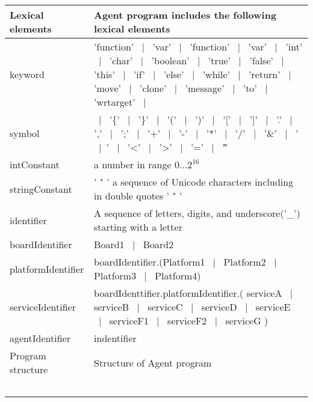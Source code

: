 \documentclass{scrreprt}
\begin{document}
\begin{longtable}{|l|p{5in}|}
\hline
Lexical elements	
&
Agent program includes the following lexical elements
\\
\hline
keyword
&
'function' $~\mid~$ 'var' $~\mid~$ 'function' $~\mid~$ 'var' $~\mid~$ 'int' $~\mid~$ 'char' $~\mid~$ 'boolean' $~\mid~$ 'true' $~\mid~$ 'false' $~\mid~$ 'this' $~\mid~$ 'if' $~\mid~$ 'else' $~\mid~$ 'while' $~\mid~$ 'return' $~\mid~$ 'move' $~\mid~$ 'clone' $~\mid~$  'message' $~\mid~$  'to'  $~\mid~$  'wrtarget'  $~\mid~$
\\
\hline
symbol
&
$~\mid~$  '\{'  $~\mid~$  '\}'  $~\mid~$  '('  $~\mid~$  ')'  $~\mid~$  '['  $~\mid~$  ']'  $~\mid~$  '.'  $~\mid~$  ','  $~\mid~$  ';'  $~\mid~$  '+'  $~\mid~$  '-'  $~\mid~$  '*'  $~\mid~$  '/'  $~\mid~$  '\&'  $~\mid~$  '$~\mid~$'  $~\mid~$  '<'  $~\mid~$  '>'  $~\mid~$  '='  $~\mid~$  '\~ 	'	
\\
\hline
intConstant
&
a number in range $0 \ldots 2^{16}$
\\
\hline
stringConstant
&
' " ' a sequence of Unicode characters including in double quotes ' " '
\\
\hline
identifier
&
A sequence of letters, digits, and underscore('_') starting with a letter
\\
\hline
boardIdentifier
&
Board1 $~\mid~$ Board2
\\
\hline
platformIdentifier
&
boardIdentifier.(Platform1 $~\mid~$ Platform2 $~\mid~$ Platform3 $~\mid~$ Platform4)
\\
\hline
serviceIdentifier
&
boardIdenttifier.platformIdentifier.( serviceA $~\mid~$ serviceB $~\mid~$ serviceC $~\mid~$ serviceD $~\mid~$ serviceE $~\mid~$ serviceF1 $~\mid~$  serviceF2 $~\mid~$ serviceG )
\\
\hline
agentIdentifier
&
indentifier
\\
\hline
Program structure
&
Structure of Agent program
\\
\hline

&

\\
\hline

&

\\
\hline

&

\\
\hline

&

\\
\hline

&


\end{longtable}
\end{document}
